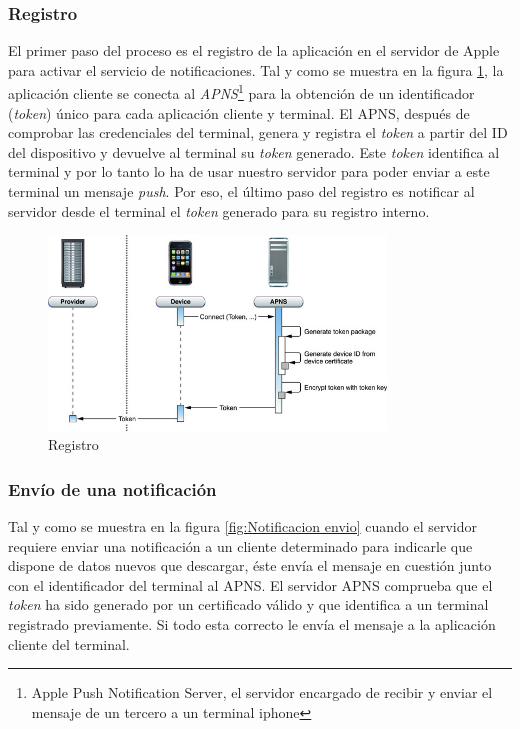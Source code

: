    \subsubsection*{Registro}

     El primer paso del proceso es el registro de la aplicación en el servidor de Apple para activar el servicio de notificaciones. Tal y como se muestra en la figura \ref{fig:Notificacion Registro}, la aplicación cliente se conecta al \emph{APNS}\footnote{Apple Push Notification Server, el servidor encargado de recibir y enviar el mensaje de un tercero a un terminal iphone} para la obtención de un identificador (\emph{token}) único para cada aplicación cliente y terminal. El APNS, después de comprobar las credenciales del terminal, genera y registra el \emph{token} a partir del ID del dispositivo y devuelve al terminal su \emph{token} generado. Este \emph{token} identifica al terminal y por lo tanto lo ha de usar nuestro servidor para poder enviar a este terminal un mensaje \emph{push}. Por eso, el último paso del registro es notificar al servidor desde el terminal el \emph{token} generado para su registro interno.
     
 \begin{figure}[h!]
    \centering
       \includegraphics[width=0.8\textwidth]{./images/token_generation.jpg}
     \caption{Registro }
   \label{fig:Notificacion Registro}
\end{figure}
  
     \subsubsection*{Envío de una notificación}
     
     Tal y como se muestra en la figura \ref{fig:Notificacion envio} cuando el servidor requiere enviar una notificación a un cliente determinado para indicarle que dispone de datos nuevos que descargar, éste envía el mensaje en cuestión junto con el identificador del terminal al APNS. El servidor APNS comprueba que el \emph{token} ha sido generado por un certificado válido y que identifica a un terminal registrado previamente. Si todo esta correcto le envía el mensaje a la aplicación cliente del terminal.
     
